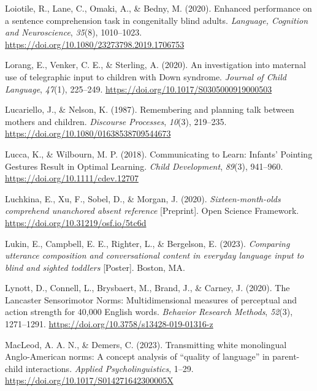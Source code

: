 \documentclass[
  man,floatsintext]{apa6}
\newlength{\cslhangindent}
\newlength{\cslentryspacingunit} %
\newenvironment{CSLReferences}[2] %
 {%
  \setlength{\parindent}{0pt}
  \ifodd #1
  \let\oldpar\par
  \def\par{\hangindent=\cslhangindent\oldpar}
  \fi
  \setlength{\parskip}{#2\cslentryspacingunit}
 }%
 {}
\begin{document}
\begin{CSLReferences}{1}{0}
\leavevmode{}%
Loiotile, R., Lane, C., Omaki, A., \& Bedny, M. (2020). Enhanced performance on a sentence comprehension task in congenitally blind adults. \emph{Language, Cognition and Neuroscience}, \emph{35}(8), 1010--1023. \url{https://doi.org/10.1080/23273798.2019.1706753}

\leavevmode{}%
Lorang, E., Venker, C. E., \& Sterling, A. (2020). An investigation into maternal use of telegraphic input to children with {Down} syndrome. \emph{Journal of Child Language}, \emph{47}(1), 225--249. \url{https://doi.org/10.1017/S0305000919000503}

\leavevmode{}%
Lucariello, J., \& Nelson, K. (1987). Remembering and planning talk between mothers and children. \emph{Discourse Processes}, \emph{10}(3), 219--235. \url{https://doi.org/10.1080/01638538709544673}

\leavevmode{}%
Lucca, K., \& Wilbourn, M. P. (2018). Communicating to {Learn}: {Infants}' {Pointing Gestures Result} in {Optimal Learning}. \emph{Child Development}, \emph{89}(3), 941--960. \url{https://doi.org/10.1111/cdev.12707}

\leavevmode{}%
Luchkina, E., Xu, F., Sobel, D., \& Morgan, J. (2020). \emph{Sixteen-month-olds comprehend unanchored absent reference} {[}Preprint{]}. Open Science Framework. \url{https://doi.org/10.31219/osf.io/5tc6d}

\leavevmode{}%
Lukin, E., Campbell, E. E., Righter, L., \& Bergelson, E. (2023). \emph{Comparing utterance composition and conversational content in everyday language input to blind and sighted toddlers} {[}Poster{]}. Boston, MA.

\leavevmode{}%
Lynott, D., Connell, L., Brysbaert, M., Brand, J., \& Carney, J. (2020). The {Lancaster Sensorimotor Norms}: Multidimensional measures of perceptual and action strength for 40,000 {English} words. \emph{Behavior Research Methods}, \emph{52}(3), 1271--1291. \url{https://doi.org/10.3758/s13428-019-01316-z}

\leavevmode{}%
MacLeod, A. A. N., \& Demers, C. (2023). Transmitting white monolingual {Anglo-American} norms: {A} concept analysis of {``quality of language''} in parent-child interactions. \emph{Applied Psycholinguistics}, 1--29. \url{https://doi.org/10.1017/S014271642300005X}


\end{CSLReferences}
\end{document}
